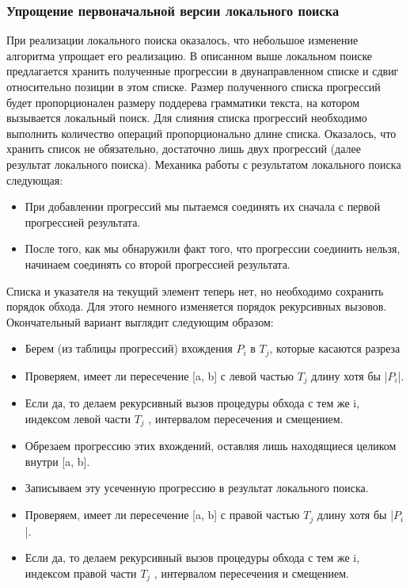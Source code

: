 \documentclass[14pt]{article}
\begin{document}
\subsubsection{Упрощение первоначальной версии локального поиска}
При реализации локального поиска оказалось, что небольшое изменение алгоритма упрощает его реализацию. В описанном выше локальном поиске предлагается хранить полученные прогрессии в двунаправленном списке и сдвиг относительно позиции в этом списке. Размер полученного списка прогрессий будет пропорционален размеру поддерева грамматики текста, на котором вызывается локальный поиск. Для слияния списка прогрессий необходимо выполнить количество операций пропорционально длине списка. 
Оказалось, что хранить список не обязательно, достаточно лишь двух прогрессий (далее результат локального поиска). Механика работы с результатом локального поиска следующая:
\begin{itemize}
\item При добавлении прогрессий мы пытаемся соединять их сначала с первой прогрессией результата.
\item После того, как мы обнаружили факт того, что прогрессии соединить нельзя, начинаем соединять со второй прогрессией результата.
\end{itemize}
Списка и указателя на текущий элемент теперь нет, но необходимо сохранить порядок обхода. Для этого немного изменяется порядок рекурсивных вызовов. Окончательный вариант выглядит следующим образом:
\begin{itemize}
	\item Берем (из таблицы прогрессий) вхождения $P_i$ в $T_j$, которые касаются разреза
	\item Проверяем, имеет ли пересечение [a, b] с левой частью $T_j$
длину хотя бы |$P_i$|.
	\item Если да, то делаем рекурсивный вызов процедуры обхода с тем же i, индексом левой части $T_j$ , интервалом пересечения и смещением.
	\item Обрезаем прогрессию этих вхождений, оставляя лишь находящиеся целиком внутри [a, b].
	\item Записываем эту усеченную прогрессию в результат локального поиска.
	\item Проверяем, имеет ли пересечение [a, b] с правой частью $T_j$
длину хотя бы |$P_i$|.
	\item Если да, то делаем рекурсивный вызов процедуры обхода с тем же i, индексом правой части $T_j$ , интервалом пересечения и смещением.
\end{itemize}
\end{document}
